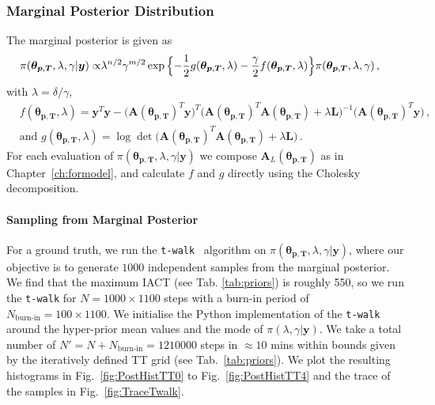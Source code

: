 \subsubsection{Marginal Posterior Distribution}
The marginal posterior is given as
\begin{align}
	\pi( \bm{\theta}_{\bm{p}, \bm{T}},\lambda,\gamma  | \bm{y}) \propto &  \lambda^{n/2} \gamma^{m/2}   \exp{ \Bigl\{ - \frac{1}{2} g ( \bm{\theta}_{\bm{p}, \bm{T}},\lambda) - \frac{\gamma}{2} f (\bm{\theta}_{\bm{p}, \bm{T}},\lambda) \Bigr\}} \pi(\bm{\theta}_{\bm{p}, \bm{T}},\lambda,\gamma ) \, ,
	\label{eq:MargPostFull}
\end{align}
with $\lambda= \delta / \gamma$,
\begin{subequations}
	\label{eq:fandg}
	\begin{align}
		&f ( \bm{\theta}_{\bm{p}, \bm{T}},\lambda) = \bm{y}^T \bm{y} - \big(\bm{A}(\bm{\theta}_{\bm{p}, \bm{T}})^T \bm{y}\big)^T \big(\bm{A}(\bm{\theta}_{\bm{p}, \bm{T}})^T  \bm{A}(\bm{\theta}_{\bm{p}, \bm{T}}) + \lambda \bm{L}\big)^{-1} \big(\bm{A}(\bm{\theta}_{\bm{p}, \bm{T}})^T \bm{y}\big)  \label{eq:fFullAppl} \, ,  \\
		&\text{and } g(\bm{\theta}_{\bm{p}, \bm{T}},\lambda) = \log \det \big(\bm{A}(\bm{\theta}_{\bm{p}, \bm{T}})^T  \bm{A}(\bm{\theta}_{\bm{p}, \bm{T}}) + \lambda \bm{L}\big) \label{eq:gFullAppl} \, .
	\end{align}
\end{subequations}
For each evaluation of $\pi( \bm{\theta}_{\bm{p}, \bm{T}},\lambda,\gamma  | \bm{y})$ we compose $\bm{A}_L(\bm{\theta}_{\bm{p}, \bm{T}})$ as in Chapter~\ref{ch:formodel}, and calculate $f$ and $g$ directly using the Cholesky decomposition.


\paragraph{Sampling from Marginal Posterior}
For a ground truth, we run the \texttt{t-walk}~\cite{christen2010general} algorithm on $\pi( \bm{\theta}_{\bm{p}, \bm{T}},\lambda,\gamma  | \bm{y})$, where our objective is to generate $1000$ independent samples from the marginal posterior.
We find that the maximum IACT (see Tab. \ref{tab:priors}) is roughly  550, so we run the \texttt{t-walk} for $N = 1000 \times 1100$ steps with a burn-in period of $N_{\text{burn-in}} = 100 \times 1100 $.
We initialise the Python implementation of the \texttt{t-walk}~\cite{christentwalkaccess} around the hyper-prior mean values and the mode of $\pi(\lambda ,\gamma|\bm{y})$.
We take a total number of $N' =N + N_{\text{burn-in}} = 1210000$ steps in $\approx 10$ mins within bounds given by the iteratively defined TT grid (see Tab.~\ref{tab:priors}).
We plot the resulting histograms in Fig.~\ref{fig:PostHistTT0} to Fig.~\ref{fig:PostHistTT4} and the trace of the samples in Fig.~\ref{fig:TraceTwalk}.

